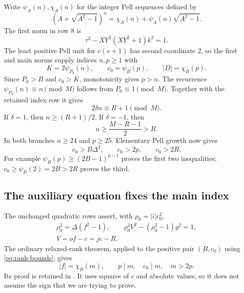 \documentclass[11pt,a4paper]{article}
\theoremstyle{remark}\newtheorem{remark}[theorem]{Remark}
\begin{document}
Write $\psi_A(n),\chi_A(n)$ for the integer Pell sequences defined by
\[
 (A+\sqrt{A^2-1})^n=\chi_A(n)+\psi_A(n)\sqrt{A^2-1}.
\]
The first norm in row 8 is
\[
 \tau^2-XY^2(XY^2+1)k^2=1.
\]
The least positive Pell unit for $v(v+1)$ has second coordinate $2$,
so the first and main norms supply indices $n,p\ge1$ with
\[
 K=2\psi_{P_0}(n),\qquad
 c_0=\psi_B(p),\qquad |D|=\chi_B(p).
\]
Since $P_0>B$ and $c_0>K$, monotonicity gives $p>n$.
The recurrence $\psi_{P_0}(n)\equiv n\pmod M$ follows from
$P_0\equiv1\pmod M$. Together with the retained index row it gives
\begin{equation}
 2\delta n\equiv R+1\pmod M.
 \label{eq:sign-congruence}
\end{equation}
If $\delta=1$, then $n\ge(R+1)/2$.
If $\delta=-1$, then
\begin{equation}
 n\ge\frac{M-R-1}{2}>R.
 \label{eq:negative-rank}
\end{equation}
In both branches $n\ge24$ and $p\ge25$. Elementary Pell growth now gives
\begin{equation}
 c_0>B\Delta^2,\qquad c_0>2p,\qquad c_0>2R.
 \label{eq:rank-bounds}
\end{equation}
For example $\psi_B(p)\ge(2B-1)^{p-1}$ proves the first two
inequalities; $c_0\ge\psi_B(2)=2B>2R$ proves the third.

\subsection{The auxiliary equation fixes the main index}

The unchanged quadratic rows assert, with $\rho_0=|i|c_0^2$,
\begin{gather*}
 \rho_0^2=\Delta(f^2-1),\qquad
 \rho_0^2V^2-(\rho_0^2-1)y^2=1,\\
 V=of-c=jc-R.
\end{gather*}
The ordinary relaxed-rank theorem, applied to the positive pair $(B,c_0)$
using \eqref{eq:rank-bounds}, gives
\[
 |f|=\chi_B(m),\qquad p\mid m,\quad c_0\mid m,\quad m>2p.
\]
Its proof is retained in .
It uses squares of $c$ and absolute values, so it does not assume the sign
that we are trying to prove.
\end{document}
